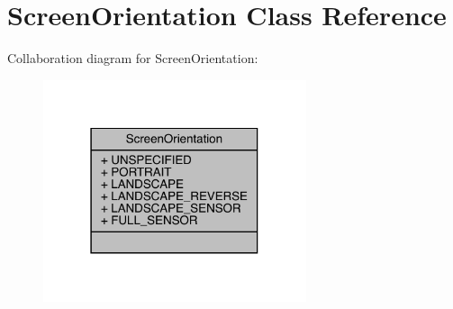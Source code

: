 \hypertarget{classcom_1_1toast_1_1android_1_1gamebase_1_1base_1_1_screen_orientation}{}\section{Screen\+Orientation Class Reference}
\label{classcom_1_1toast_1_1android_1_1gamebase_1_1base_1_1_screen_orientation}


Collaboration diagram for Screen\+Orientation\+:
\nopagebreak
\begin{figure}[H]
\begin{center}
\leavevmode
\includegraphics[width=219pt]{classcom_1_1toast_1_1android_1_1gamebase_1_1base_1_1_screen_orientation__coll__graph}
\end{center}
\end{figure}
